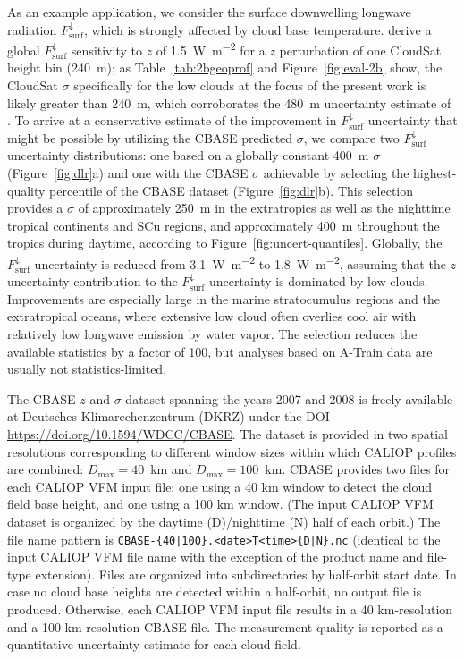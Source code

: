 \documentclass[essd,manuscript]{copernicus}
\begin{document}
As an example application, we consider the surface downwelling longwave
radiation \ensuremath{F_\text{surf}^\downarrow}{}, which is strongly affected by cloud base temperature.
\cite{Henderson2013} derive a global \ensuremath{F_\text{surf}^\downarrow}{} sensitivity to \ensuremath{z}{} of
1.5~\unit{W~m^{-2}} for a \ensuremath{z}{} perturbation of one CloudSat height bin
(240~\unit{m}); as Table~\ref{tab:2bgeoprof} and Figure~\ref{fig:eval-2b} show,
the CloudSat $\sigma$ specifically for the low clouds at the focus of the
present work is likely greater than 240~\unit{m}, which corroborates the
480~\unit{m} uncertainty estimate of \cite{Kato2011}. To arrive at a
conservative estimate of the improvement in \ensuremath{F_\text{surf}^\downarrow}{} uncertainty that might be
possible by utilizing the CBASE predicted $\sigma$, we compare two \ensuremath{F_\text{surf}^\downarrow}{}
uncertainty distributions: one based on a globally constant 400~\unit{m} $\sigma$
(Figure~\ref{fig:dlr}a) and one with the CBASE $\sigma$ achievable by selecting
the highest-quality percentile of the CBASE dataset
(Figure~\ref{fig:dlr}b). This selection provides a $\sigma$ of approximately
250~\unit{m} in the extratropics as well as the nighttime tropical continents
and SCu regions, and approximately 400~\unit{m} throughout the tropics during
daytime, according to Figure~\ref{fig:uncert-quantiles}.  Globally, the \ensuremath{F_\text{surf}^\downarrow}{}
uncertainty is reduced from 3.1~\unit{W~m^{-2}} to 1.8~\unit{W~m^{-2}}, assuming
that the \ensuremath{z}{} uncertainty contribution to the \ensuremath{F_\text{surf}^\downarrow}{} uncertainty is dominated
by low clouds.  Improvements are especially large in the marine stratocumulus
regions and the extratropical oceans, where extensive low cloud often overlies
cool air with relatively low longwave emission by water vapor. The selection
reduces the available statistics by a factor of 100, but analyses based on
A-Train data are usually not statistics-limited.

The CBASE \ensuremath{z}{} and $\sigma$ dataset \citep{cbase} spanning the years 2007 and
2008 is freely available at Deutsches Klimarechenzentrum (DKRZ) under the DOI
\url{https://doi.org/10.1594/WDCC/CBASE}.  The dataset is provided in two
spatial resolutions corresponding to different window sizes within which CALIOP
profiles are combined: $D_\text{max} = 40$~\unit{km} and
$D_\text{max} = 100$~\unit{km}.  CBASE provides two files for each CALIOP VFM
input file: one using a 40 km window to detect the cloud field base height, and
one using a 100 km window. (The input CALIOP VFM dataset is organized by the
daytime (D)/nighttime (N) half of each orbit.) The file name pattern is
\verb+CBASE-{40|100}.<date>T<time>{D|N}.nc+ (identical to the input CALIOP VFM
file name with the exception of the product name and file-type extension). Files
are organized into subdirectories by half-orbit start date.  In case no cloud
base heights are detected within a half-orbit, no output file is
produced. Otherwise, each CALIOP VFM input file results in a 40 km-resolution
and a 100-km resolution CBASE file. The measurement quality is reported as a
quantitative uncertainty estimate for each cloud field.
\end{document}
